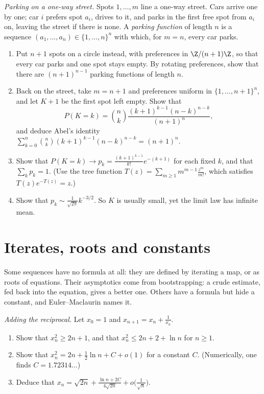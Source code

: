 \begin{exercise}[$\star\star$]\label{pb:parking}
\emph{Parking on a one-way street.} Spots $1,\dots,m$ line a one-way street. Cars arrive one by one; car $i$ prefers spot $a_i$, drives to it, and
parks in the first free spot from $a_i$ on, leaving the street if there is none. A \emph{parking function} of length $n$ is a sequence
$(a_1,\dots,a_n)\in\{1,\dots,n\}^n$ with which, for $m=n$, every car parks.
\begin{enumerate}[label=(\alph*)]
\item Put $n+1$ spots on a circle instead, with preferences in $\Z/(n+1)\Z$, so that every car parks and one spot stays empty. By rotating preferences,
show that there are $(n+1)^{n-1}$ parking functions of length $n$.
\item Back on the street, take $m=n+1$ and preferences uniform in $\{1,\dots,n+1\}^n$, and let $K+1$ be the first spot left empty. Show that
\[
P(K=k)=\binom nk\frac{(k+1)^{k-1}(n-k)^{n-k}}{(n+1)^n},
\]
and deduce Abel's identity $\sum_{k=0}^n\binom nk(k+1)^{k-1}(n-k)^{n-k}=(n+1)^n$.
\item Show that $P(K=k)\to p_k=\frac{(k+1)^{k-1}}{k!}e^{-(k+1)}$ for each fixed $k$, and that $\sum_kp_k=1$. (Use the tree function $T(z)=\sum_{m\ge1}m^{m-1}\frac{z^m}{m!}$,
which satisfies $T(z)e^{-T(z)}=z$.)
\item Show that $p_k\sim\frac1{\sqrt{2\pi}}k^{-3/2}$. So $K$ is usually small, yet the limit law has infinite mean.
\end{enumerate}
\end{exercise}

\section{Iterates, roots and constants}

Some sequences have no formula at all: they are defined by iterating a map, or as roots of equations. Their asymptotics come from
bootstrapping: a crude estimate, fed back into the equation, gives a better one. Others have a formula but hide a constant, and
Euler--Maclaurin names it.

\begin{exercise}[$\star\star$]\label{pb:xplusinv}
\emph{Adding the reciprocal.} Let $x_0=1$ and $x_{n+1}=x_n+\frac1{x_n}$.
\begin{enumerate}[label=(\alph*)]
\item Show that $x_n^2\ge2n+1$, and that $x_n^2\le2n+2+\ln n$ for $n\ge1$.
\item Show that $x_n^2=2n+\frac12\ln n+C+o(1)$ for a constant $C$. (Numerically, one finds $C=1.72314\ldots$)
\item Deduce that $x_n=\sqrt{2n}+\frac{\ln n+2C}{4\sqrt{2n}}+o\bigl(\frac1{\sqrt n}\bigr)$.
\end{enumerate}
\end{exercise}

